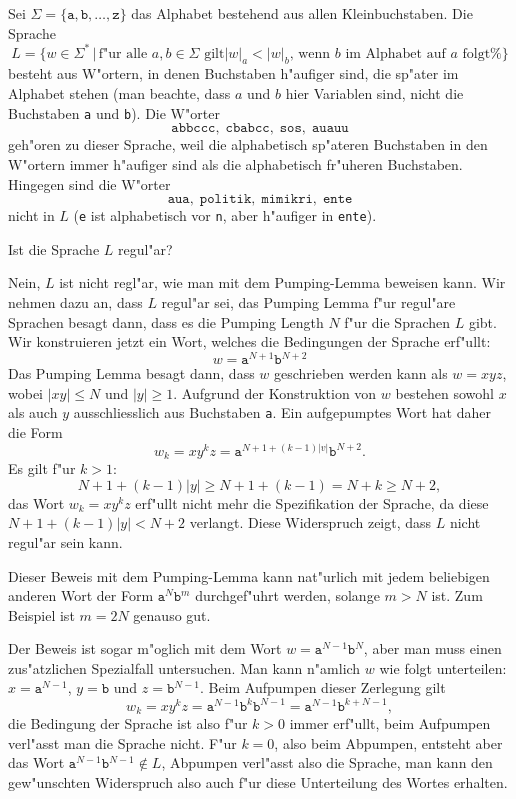 Sei $\Sigma=\{\texttt{a},\texttt{b},\dots,\texttt{z}\}$ das Alphabet
bestehend aus allen Kleinbuchstaben. Die Sprache
\[
L=\{ w\in\Sigma^*
\,
|\,
\text{
f"ur alle $a,b\in\Sigma$ gilt
$|w|_a < |w|_b$, wenn $b$ im Alphabet auf $a$ folgt%
}
\}
\]
besteht aus W"ortern, in denen Buchstaben h"aufiger sind, die sp"ater im
Alphabet stehen (man beachte, dass $a$ und $b$ hier Variablen sind,
nicht die Buchstaben \texttt{a} und \texttt{b}).
Die W"orter
\[
\texttt{abbccc},\;
\texttt{cbabcc},\;
\texttt{sos},\;
\texttt{auauu}
\]
geh"oren zu dieser Sprache, weil die alphabetisch sp"ateren Buchstaben
in den W"ortern immer h"aufiger sind als die alphabetisch
fr"uheren Buchstaben. Hingegen sind die W"orter 
\[
\texttt{aua},\;
\texttt{politik},\;
\texttt{mimikri},\;
\texttt{ente}
\]
nicht in $L$ (\texttt{e} ist alphabetisch vor \texttt{n}, aber h"aufiger
in \texttt{ente}).

Ist die Sprache $L$ regul"ar?

\begin{loesung}
Nein, $L$ ist nicht regl"ar, wie man mit dem Pumping-Lemma beweisen kann.
Wir nehmen dazu an, dass $L$ regul"ar sei, das Pumping Lemma f"ur
regul"are Sprachen besagt dann, dass es die Pumping Length $N$ f"ur die
Sprachen $L$ gibt.
Wir konstruieren jetzt ein Wort, welches die Bedingungen der Sprache
erf"ullt:
\[
w=\texttt{a}^{N+1}\texttt{b}^{N+2}
\]
Das Pumping Lemma besagt dann, dass $w$ geschrieben werden kann als
$w=xyz$, wobei $|xy|\le N$ und $|y|\ge 1$. 
Aufgrund der Konstruktion von $w$ bestehen sowohl $x$ als auch $y$
ausschliesslich aus Buchstaben \texttt{a}.
Ein aufgepumptes Wort hat daher die Form
\[
w_k=xy^kz = \texttt{a}^{N+1+(k-1)|v|}\texttt{b}^{N+2}.
\]
Es gilt f"ur $k > 1$:
\[
N+1+(k-1)|y|\ge N+1+(k-1)=N+k\ge N+2,
\]
das Wort $w_k=xy^kz$ erf"ullt nicht mehr die Spezifikation der Sprache,
da diese $N+1+(k-1)|y| < N+2$ verlangt.
Diese Widerspruch zeigt, dass $L$ nicht regul"ar sein kann.
\end{loesung}

\begin{diskussion}
Dieser Beweis mit dem Pumping-Lemma kann nat"urlich mit jedem beliebigen
anderen Wort der Form $\texttt{a}^N\texttt{b}^{m}$ durchgef"uhrt werden,
solange $m > N$ ist. Zum Beispiel ist $m=2N$ genauso gut.

Der Beweis ist sogar m"oglich mit dem Wort $w=\texttt{a}^{N-1}\texttt{b}^N$,
aber man muss einen zus"atzlichen Spezialfall untersuchen.
Man kann n"amlich $w$ wie folgt unterteilen:
$x=\texttt{a}^{N-1}$, $y=\texttt{b}$ und $z=\texttt{b}^{N-1}$.
Beim Aufpumpen dieser Zerlegung gilt
\[
w_k=xy^kz=\texttt{a}^{N-1}\texttt{b}^k\texttt{b}^{N-1}
=
\texttt{a}^{N-1}\texttt{b}^{k+N-1},
\]
die Bedingung der Sprache ist also f"ur $k>0$ immer erf"ullt, beim Aufpumpen
verl"asst man die Sprache nicht.
F"ur $k=0$, also beim Abpumpen, entsteht aber das Wort
$\texttt{a}^{N-1}\texttt{b}^{N-1}\not\in L$, Abpumpen verl"asst also die
Sprache, man kann den gew"unschten Widerspruch also auch f"ur diese
Unterteilung des Wortes erhalten.
\end{diskussion}

